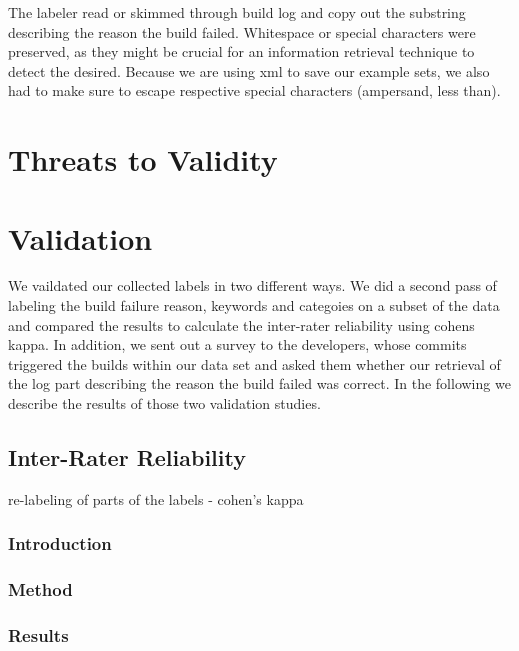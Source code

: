 \documentclass[\myrootdir/main.tex]{subfiles}
\begin{document}
The labeler read or skimmed through build log and copy out the substring describing the reason the build failed.
Whitespace or special characters were preserved, as they might be crucial for an information retrieval technique to detect the desired.
Because we are using xml to save our example sets, we also had to make sure to escape respective special characters (ampersand, less than).

\section{Threats to Validity}

\section{Validation}
We vaildated our collected labels in two different ways. We did a second pass of labeling the build failure reason, keywords and categoies on a subset of the data and compared the results to calculate the inter-rater reliability using cohens kappa. In addition, we sent out a survey to the developers, whose commits triggered the builds within our data set and asked them whether our retrieval of the log part describing the reason the build failed was correct. In the following we describe the results of those two validation studies.

\subsection{Inter-Rater Reliability}
re-labeling of parts of the labels - cohen's kappa
\subsubsection{Introduction}
\subsubsection{Method}
\subsubsection{Results}
\end{document}
